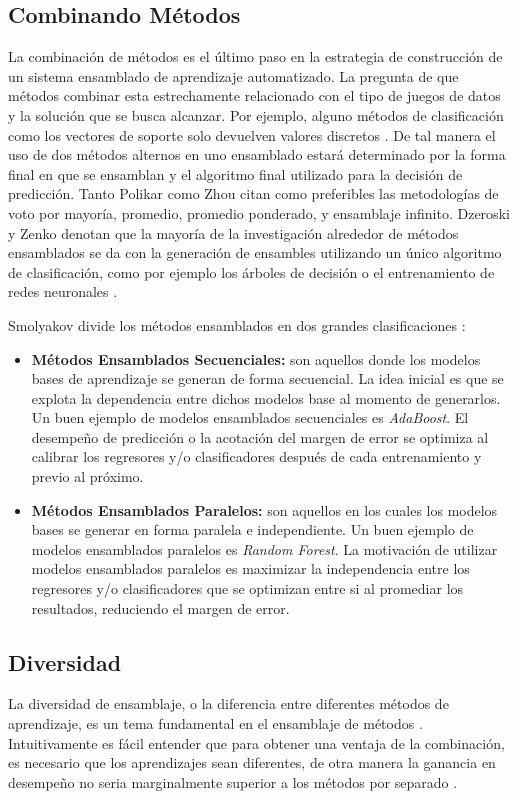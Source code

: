 \subsection{Combinando Métodos}
La combinación de métodos es el último paso en la estrategia de construcción de un sistema ensamblado de aprendizaje automatizado. La pregunta de que métodos combinar esta estrechamente relacionado con el tipo de juegos de datos y la solución que se busca alcanzar. Por ejemplo, alguno métodos de clasificación como los vectores de soporte solo devuelven valores discretos \cite{ensembleMachineLearning}. De tal manera el uso de dos métodos alternos en uno ensamblado estará determinado por la forma final en que se ensamblan y el algoritmo final utilizado para la decisión de predicción. Tanto Polikar \cite{ensembleMachineLearning} como Zhou \cite{ensembleMethods} citan como preferibles las metodologías de voto por mayoría, promedio, promedio ponderado, y ensamblaje infinito. Dzeroski y Zenko denotan que la mayoría de la investigación alrededor de métodos ensamblados se da con la generación de ensambles utilizando un único algoritmo de clasificación, como por ejemplo los árboles de decisión o el entrenamiento de redes neuronales \cite{DzeroskiZenko}. 

Smolyakov divide los métodos ensamblados en dos grandes clasificaciones \cite{smolyakov}:

\begin{itemize}
  \item \textbf{Métodos Ensamblados Secuenciales:} son aquellos donde los modelos bases de aprendizaje se generan de forma secuencial. La idea inicial es que se explota la dependencia entre dichos modelos base al momento de generarlos. Un buen ejemplo de modelos ensamblados secuenciales es \emph{AdaBoost}. El desempeño de predicción o la acotación del margen de error se optimiza al calibrar los regresores y/o clasificadores después de cada entrenamiento y previo al próximo. 
  \item \textbf{Métodos Ensamblados Paralelos:} son aquellos en los cuales los modelos bases se generar en forma paralela e independiente. Un buen ejemplo de modelos ensamblados paralelos es \emph{Random Forest}. La motivación de utilizar modelos ensamblados paralelos es maximizar la independencia entre los regresores y/o clasificadores que se optimizan entre si al promediar los resultados, reduciendo el margen de error. 
\end{itemize}

\subsection{Diversidad}
La diversidad de ensamblaje, o la diferencia entre diferentes métodos de aprendizaje, es un tema fundamental en el ensamblaje de métodos \cite{ensembleMethods}. Intuitivamente es fácil entender que para obtener una ventaja de la combinación, es necesario que los aprendizajes sean diferentes, de otra manera la ganancia en desempeño no seria marginalmente superior a los métodos por separado \cite{ensembleMethods}.

